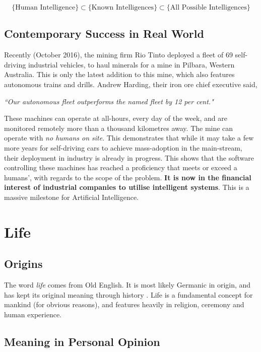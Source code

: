 \documentclass[10pt,a4paper]{article}
\begin{document}
				\medskip
				\[
				\text{\{Human Intelligence\}}\subset\text{\{Known Intelligences\}}\subset\text{\{All Possible Intelligences\}}
				\]
		
			\subsection{Contemporary Success in Real World}
				
				Recently (October 2016), the mining firm Rio Tinto deployed a fleet of 69 self-driving industrial vehicles, to haul minerals for a mine in Pilbara, Western Australia. This is only the latest addition to this mine, which also features autonomous trains and drills. Andrew Harding, their iron ore chief executive said, 
				
				\begin{center}
					\textsl{``Our autonomous fleet outperforms the named fleet by 12 per cent."	}
				\end{center}

				 These machines can operate at all-hours, every day of the week, and are monitored remotely more than a thousand kilometres away. The mine can operate with \textsl{no humans on site}. This demonstrates that while it may take a few more years for self-driving cars to achieve mass-adoption in the main-stream, their deployment in industry is already in progress. This shows that the software controlling these machines has reached a proficiency that meets or exceed a humans', with regards to the scope of the problem. \textbf{It is now in the financial interest of industrial companies to utilise intelligent systems}. This is a massive milestone for Artificial Intelligence.
		

		\pagebreak
		\section{Life}
		
			\subsection{Origins}
		
				The word \textsl{life} comes from Old English. It is most likely Germanic in origin, and has kept its original meaning through history \cites{etymonline2017}. Life is a fundamental concept for mankind (for obvious reasons), and features heavily in religion, ceremony and human experience.
	
			\subsection{Meaning in Personal Opinion}
	
\end{document}
